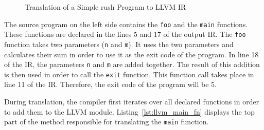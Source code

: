 \noindent
\begin{figure}[h]
	\begin{minipage}{.5\textwidth}
		\centering
	\end{minipage}%
	\begin{minipage}{.5\textwidth}
		\centering
	\end{minipage}
	\caption{Translation of a Simple rush Program to LLVM IR}\label{fig:llvm_simple}
\end{figure}

The source program on the left side contains the \texttt{foo} and the \texttt{main} functions.
These functions are declared in the lines 5 and 17 of the output IR.
The \texttt{foo} function takes two parameters (\texttt{n} and \texttt{m}).
It uses the two parameters and calculates their sum in order to use it as the exit code of the program.
In line 18 of the IR, the parameters \texttt{n} and \texttt{m} are added together.
The result of this addition is then used in order to call the \texttt{exit} function.
This function call takes place in line 11 of the IR.
Therefore, the exit code of the program will be 5.

During translation, the compiler first iterates over all declared functions in order to add them to the LLVM module.
Listing~\ref{lst:llvm_main_fn} displays the top part of the method responsible for translating the \texttt{main} function.


